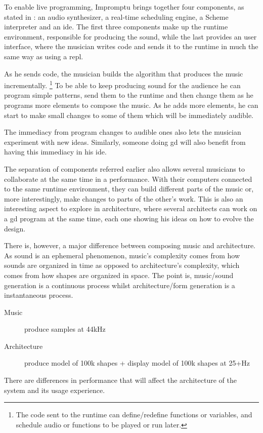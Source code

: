 To enable live programming, Impromptu brings together four components, as stated in \cite{sorensen2005impromptu}: an audio synthesizer, a real-time scheduling engine, a Scheme interpreter and an \gls{ide}.
The first three components make up the runtime environment, responsible for producing the sound, while the last provides an user interface, where the musician writes code and sends it to the runtime in much the same way as using a \gls{repl}.

As he sends code, the musician builds the algorithm that produces the music incrementally.%
\footnote{The code sent to the runtime can define/redefine functions or variables, and schedule audio or functions to be played or run later.}
To be able to keep producing sound for the audience he can program simple patterns, send them to the runtime and then change them as he programs more elements to compose the music.
As he adds more elements, he can start to make small changes to some of them which will be immediately audible.

The immediacy from program changes to audible ones also lets the musician experiment with new ideas.
Similarly, someone doing \gls{gd} will also benefit from having this immediacy in his \gls{ide}.

The separation of components referred earlier also allows several musicians to collaborate at the same time in a performance\cite{sorensen2005impromptu}.
With their computers connected to the same runtime environment, they can build different parts of the music or, more interestingly, make changes to parts of the other's work.
This is also an interesting aspect to explore in architecture, where several architects can work on a \gls{gd} program at the same time, each one showing his ideas on how to evolve the design.

There is, however, a major difference between composing music and architecture.
As sound is an ephemeral phenomenon, music's complexity comes from how sounds are organized in time as opposed to architecture's complexity, which comes from how shapes are organized in space.
The point is, music/sound generation is a continuous process whilst architecture/form generation is a instantaneous process.
\begin{description}
	\item[Music] produce samples at 44kHz
	\item[Architecture] produce model of 100k shapes + display model of 100k shapes at 25+Hz
\end{description}
There are differences in performance that will affect the architecture of the system and its usage experience.


